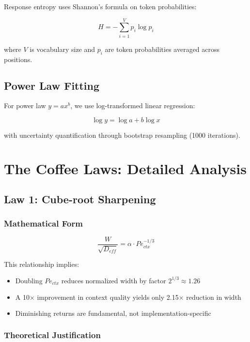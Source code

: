 \documentclass[conference]{IEEEtran}
\begin{document}
Response entropy uses Shannon's formula on token probabilities:

\begin{equation}
H = -\sum_{i=1}^{V} p_i \log p_i
\end{equation}

where $V$ is vocabulary size and $p_i$ are token probabilities averaged across positions.

\subsection{Power Law Fitting}

For power law $y = ax^b$, we use log-transformed linear regression:

\begin{equation}
\log y = \log a + b \log x
\end{equation}

with uncertainty quantification through bootstrap resampling (1000 iterations).

\section{The Coffee Laws: Detailed Analysis}

\subsection{Law 1: Cube-root Sharpening}

\subsubsection{Mathematical Form}

\begin{equation}
\frac{W}{\sqrt{D_{eff}}} = \alpha \cdot Pe_{ctx}^{-1/3}
\end{equation}

This relationship implies:
\begin{itemize}
\item Doubling $Pe_{ctx}$ reduces normalized width by factor $2^{1/3} \approx 1.26$
\item A 10× improvement in context quality yields only 2.15× reduction in width
\item Diminishing returns are fundamental, not implementation-specific
\end{itemize}

\subsubsection{Theoretical Justification}
\end{document}
